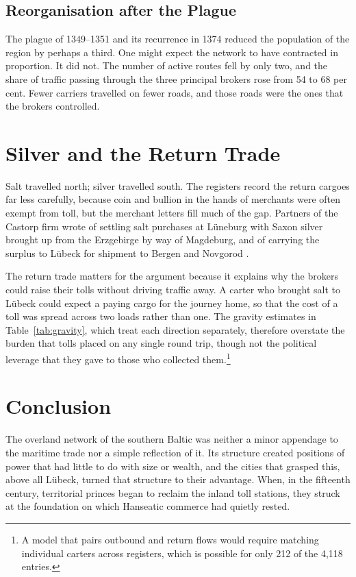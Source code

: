 \subsection{Reorganisation after the Plague}

The plague of 1349--1351 and its recurrence in 1374 reduced the population of the region by perhaps a third. One might expect the network to have contracted in proportion. It did not. The number of active routes fell by only two, and the share of traffic passing through the three principal brokers rose from 54 to 68 per cent. Fewer carriers travelled on fewer roads, and those roads were the ones that the brokers controlled.

\section{Silver and the Return Trade}

Salt travelled north; silver travelled south. The registers record the return cargoes far less carefully, because coin and bullion in the hands of merchants were often exempt from toll, but the merchant letters fill much of the gap. Partners of the Castorp firm wrote of settling salt purchases at Lüneburg with Saxon silver brought up from the Erzgebirge by way of Magdeburg, and of carrying the surplus to Lübeck for shipment to Bergen and Novgorod \parencite{selzer2003}.

The return trade matters for the argument because it explains why the brokers could raise their tolls without driving traffic away. A carter who brought salt to Lübeck could expect a paying cargo for the journey home, so that the cost of a toll was spread across two loads rather than one. The gravity estimates in Table~\ref{tab:gravity}, which treat each direction separately, therefore overstate the burden that tolls placed on any single round trip, though not the political leverage that they gave to those who collected them.\footnote{A model that pairs outbound and return flows would require matching individual carters across registers, which is possible for only 212 of the 4,118 entries.}

\section{Conclusion}

The overland network of the southern Baltic was neither a minor appendage to the maritime trade nor a simple reflection of it. Its structure created positions of power that had little to do with size or wealth, and the cities that grasped this, above all Lübeck, turned that structure to their advantage. When, in the fifteenth century, territorial princes began to reclaim the inland toll stations, they struck at the foundation on which Hanseatic commerce had quietly rested.
